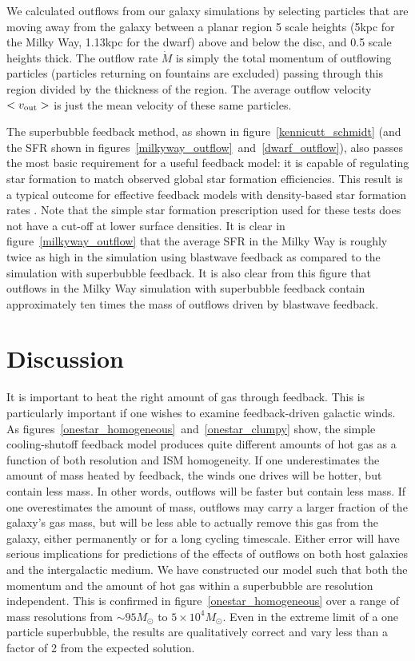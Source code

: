 We calculated outflows from our galaxy simulations by selecting particles that
are moving away from the galaxy between a planar region 5 scale heights (5kpc
for the Milky Way, 1.13kpc for the dwarf) above and below the disc, and 0.5
scale heights thick.  The outflow rate $\dot M$ is simply the total momentum of
outflowing particles (particles returning on fountains are excluded) passing
through this region divided by the thickness of the region.  The average outflow
velocity $<v_{\rm out}>$ is just the mean velocity of these same particles.

The superbubble feedback method, as shown in figure~\ref{kennicutt_schmidt} (and
the SFR shown in figures~\ref{milkyway_outflow}~and~\ref{dwarf_outflow}), also
passes the most basic requirement for a useful feedback model:  it is capable of
regulating star formation to match observed global star formation efficiencies.
This result is a typical outcome for effective feedback models with density-based 
star formation rates \citep[e.g.][]{Springel2003}.
Note that the simple star formation prescription used for
these tests does not have a cut-off at lower surface densities.  It is clear in
figure~\ref{milkyway_outflow} that the average SFR in the Milky Way is roughly
twice as high in the simulation using blastwave feedback as compared to the
simulation with superbubble feedback.  It is also clear from this figure that
outflows in the Milky Way simulation with superbubble feedback contain
approximately ten times the mass of outflows driven by blastwave feedback.

\section{Discussion}

It is important to heat the right amount of gas through feedback. This is
particularly important if one wishes to examine feedback-driven galactic winds.
As figures~\ref{onestar_homogeneous}~and~\ref{onestar_clumpy} show, the simple
cooling-shutoff feedback model produces quite different amounts of hot gas as a
function of both resolution and ISM homogeneity.  If one underestimates the
amount of mass heated by feedback, the winds one drives will be hotter, but
contain less mass.  In other words, outflows will be faster but contain less
mass.  If one overestimates the amount of mass, outflows may carry a larger
fraction of the galaxy's gas mass, but will be less able to actually remove
this gas from the galaxy, either permanently or for a long cycling timescale.
Either error will have  serious implications for predictions of the effects of
outflows on both host galaxies and the intergalactic medium.  We have
constructed our model such that both the momentum and the amount of hot gas
within a superbubble are resolution independent.  This is confirmed in
figure~\ref{onestar_homogeneous} over a range of mass 
resolutions from $\sim95M_\odot$ to $5\times10^4M_\odot$.  
Even in the extreme limit of a one particle superbubble,
the results are qualitatively correct and vary less than a factor of 2
from the expected solution.

